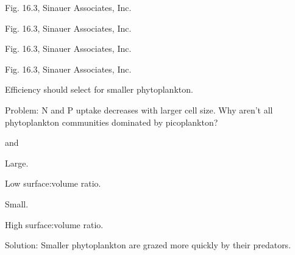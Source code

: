 \documentclass[t,handout]{beamer}  %
\begin{document}
%
{
\begin{frame}[b]

	\hfill \tiny Fig. 16.3, \textcopyright Sinauer Associates, Inc.
\end{frame}
}
%
{
\begin{frame}[b]

	\hfill \tiny Fig. 16.3, \textcopyright Sinauer Associates, Inc.
\end{frame}
}
%
{
\begin{frame}[b]

	\hfill \tiny Fig. 16.3, \textcopyright Sinauer Associates, Inc.
\end{frame}
}
%
{
\begin{frame}[b]

	\hfill \tiny Fig. 16.3, \textcopyright Sinauer Associates, Inc.
\end{frame}
}
%
\begin{frame}[t]{Efficiency should select for smaller phytoplankton.}

\hangpara Problem: N and P uptake decreases with larger cell size. Why aren't all phytoplankton communities dominated by picoplankton?

\begin{multicols}{2}

		\hangpara {} and 

		\hangpara Large.
		
		\hangpara Low surface:volume ratio.
				
\columnbreak

		\hangpara {}

		\hangpara Small.

		\hangpara High surface:volume ratio.
		
\end{multicols}

\pause

\hangpara Solution: Smaller phytoplankton are grazed more quickly by their predators.

\end{frame}
%
\end{document}
